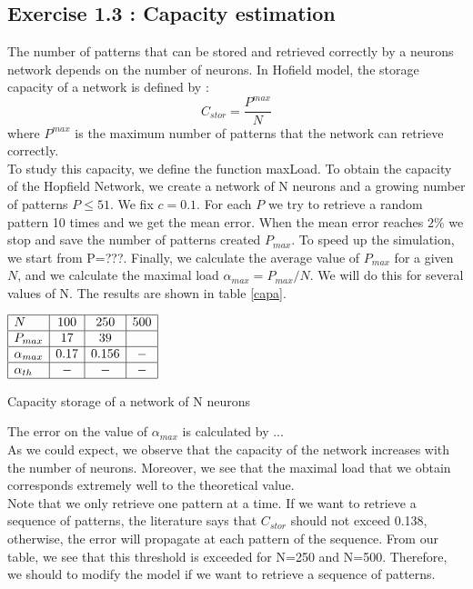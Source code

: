 \subsection{Exercise 1.3 : Capacity estimation}
The number of patterns that can be stored and retrieved correctly by a neurons network depends on the number of neurons. In Hofield model, the storage capacity of a network is defined by :
\begin{equation}\nonumber
C_{stor} =\frac{ P^{max}}{N}
\end{equation} 
where $P^{max}$ is the maximum number of patterns that the network can retrieve correctly. \\
To study this capacity, we define the function maxLoad. To obtain the capacity of the Hopfield Network, we create a network of N neurons and a growing number of patterns $P \leq 51$.  We fix $c=0.1$. For each $P$ we try to retrieve a random pattern 10 times and we get the mean error. When the mean error reaches $2\%$ we stop and save the number of patterns created $P_{max}$. To speed up the simulation, we start from P=???. Finally, we calculate the average value of $P_{max}$ for a given $N$, and we calculate the maximal load $\alpha_{max} = P_{max}/N$. We will do this for several values of N. The results are shown in table \ref{capa}.  
\begin{table}[h]\label{capa}
\begin{center}
\begin{math}
    \begin{array}{|l|c|c|c|}
    \hline
    N & 100 & 250 & 500 \\ \hline
    P_{max} & 17 & 39 &  \\ \hline
    \alpha_{max} & 0.17 & 0.156 & - \\ \hline
    \alpha_{th} & - & - & - \\ \hline
    \end{array}
\end{math}
\end{center}
\caption{Capacity storage of a network of N neurons }
\end{table}
The error on the value of $\alpha_{max}$ is calculated by ... \\
As we could expect, we observe that the capacity of the network increases with the number of neurons. Moreover, we see that the maximal load that we obtain corresponds extremely well to the theoretical value.\\
Note that we only retrieve one pattern at a time. If we want to retrieve a sequence of patterns, the literature says that $C_{stor}$ should not exceed 0.138\cite{prof}, otherwise, the error will propagate at each pattern of the sequence. From our table, we see that this threshold is exceeded for N=250 and N=500. Therefore, we should to modify the model if we want to retrieve a sequence of patterns. 

